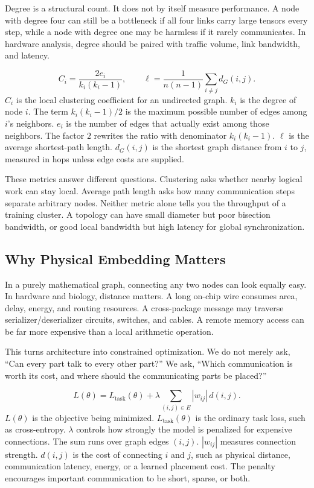 Degree is a structural count. It does not by itself measure performance. A node with degree four can still be a bottleneck if all four links carry large tensors every step, while a node with degree one may be harmless if it rarely communicates. In hardware analysis, degree should be paired with traffic volume, link bandwidth, and latency.

\begin{keyequation}
\[
  C_i =
  \frac{2e_i}{k_i(k_i-1)},
  \qquad
  \ell =
  \frac{1}{n(n-1)}
  \sum_{i \ne j} d_G(i,j).
\]
\tcblower
\(C_i\) is the local clustering coefficient for an undirected graph. \(k_i\) is the degree of node \(i\). The term \(k_i(k_i-1)/2\) is the maximum possible number of edges among \(i\)'s neighbors. \(e_i\) is the number of edges that actually exist among those neighbors. The factor \(2\) rewrites the ratio with denominator \(k_i(k_i-1)\). \(\ell\) is the average shortest-path length. \(d_G(i,j)\) is the shortest graph distance from \(i\) to \(j\), measured in hops unless edge costs are supplied.
\end{keyequation}

These metrics answer different questions. Clustering asks whether nearby logical work can stay local. Average path length asks how many communication steps separate arbitrary nodes. Neither metric alone tells you the throughput of a training cluster. A topology can have small diameter but poor bisection bandwidth, or good local bandwidth but high latency for global synchronization.

\subsection{Why Physical Embedding Matters}

In a purely mathematical graph, connecting any two nodes can look equally easy. In hardware and biology, distance matters. A long on-chip wire consumes area, delay, energy, and routing resources. A cross-package message may traverse serializer/deserializer circuits, switches, and cables. A remote memory access can be far more expensive than a local arithmetic operation.

This turns architecture into constrained optimization. We do not merely ask, ``Can every part talk to every other part?'' We ask, ``Which communication is worth its cost, and where should the communicating parts be placed?''

\begin{keyequation}
\[
  L(\theta)
  =
  L_{\text{task}}(\theta)
  +
  \lambda
  \sum_{(i,j) \in E}
    |w_{ij}| \, d(i,j).
\]
\tcblower
\(L(\theta)\) is the objective being minimized. \(L_{\text{task}}(\theta)\) is the ordinary task loss, such as cross-entropy. \(\lambda\) controls how strongly the model is penalized for expensive connections. The sum runs over graph edges \((i,j)\). \(|w_{ij}|\) measures connection strength. \(d(i,j)\) is the cost of connecting \(i\) and \(j\), such as physical distance, communication latency, energy, or a learned placement cost. The penalty encourages important communication to be short, sparse, or both.
\end{keyequation}

